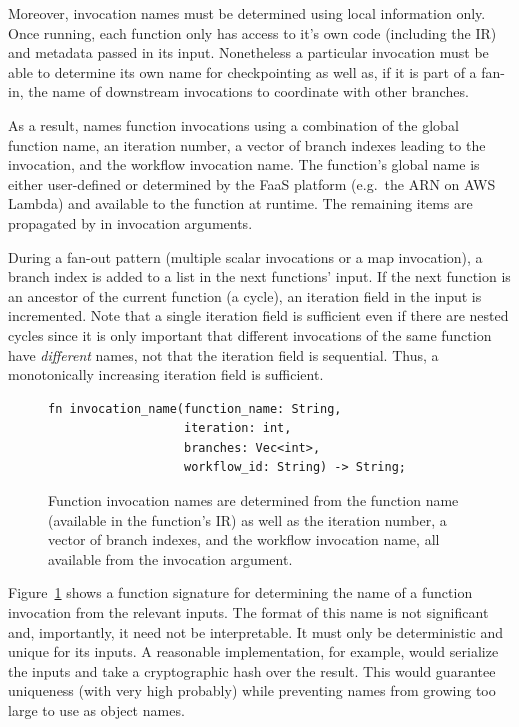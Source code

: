 Moreover, invocation names must be determined using local information only. Once
running, each function only has access to it's own code (including the IR) and
metadata passed in its input. Nonetheless a particular invocation must be able
to determine its own name for checkpointing as well as, if it is part of a
fan-in, the name of downstream invocations to coordinate with other branches.

As a result, \name{} names function invocations using a combination of the
global function name, an iteration number, a vector of branch indexes leading to
the invocation, and the workflow invocation name. The function's global name is
either user-defined or determined by the FaaS platform (e.g.\ the ARN on AWS
Lambda) and available to the function at runtime. The remaining items are
propagated by \name{} in invocation arguments.

During a fan-out pattern (multiple scalar invocations or a map invocation), a
branch index is added to a list in the next functions' input. If the next
function is an ancestor of the current function (a cycle), an iteration field in
the input is incremented. Note that a single iteration field is sufficient even
if there are nested cycles since it is only important that different invocations
of the same function have \emph{different} names, not that the iteration field
is sequential. Thus, a monotonically increasing iteration field is sufficient.

\begin{figure}
\begin{verbatim}
fn invocation_name(function_name: String,
                   iteration: int,
                   branches: Vec<int>,
                   workflow_id: String) -> String;
\end{verbatim}
\caption{Function invocation names are determined from the function name
(available in the function's IR) as well as the iteration number, a vector of
branch indexes, and the workflow invocation name, all available from the
invocation argument.}
\label{fig:design:names}
\end{figure}

Figure~\ref{fig:design:names} shows a function signature for determining the name of a
function invocation from the relevant inputs. The format of this name is not
significant and, importantly, it need not be interpretable. It must only be
deterministic and unique for its inputs. A reasonable implementation, for
example, would serialize the inputs and take a cryptographic hash over the
result. This would guarantee uniqueness (with very high probably) while
preventing names from growing too large to use as object names.
